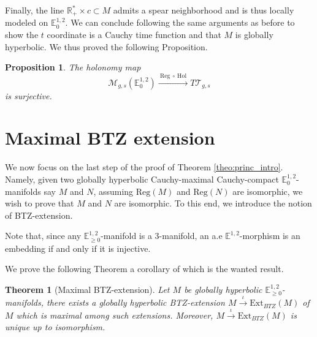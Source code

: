 \documentclass[a4paper,12pt]{article}
\def\M{\mathcal{M}}
\def\T{\mathcal{T}}
\def\RR{\mathbb{R}}
\newcommand{\mass}[1]{{\mathbb E}^{1,2}_{#1}}
\def\Hol{\mathrm{Hol}}
\def\Reg{\mathrm{Reg}}
\def\BTZext{\mathrm{Ext}_{BTZ}}
\def\reg{\Reg}
\newtheorem{theo}{Theorem}    %
\newtheorem{propou}[lemou]{Proposition}
\begin{document}
  Finally, the line $\RR_+^*\times c \subset M$ admits a spear neighborhood and is thus  locally modeled on $\mass{0}$. We can conclude following the same arguments as before to show the $t$ coordinate is a Cauchy time function and that $M$ is globally hyperbolic. We thus proved the following Proposition.



\begin{propou}\label{btzprop:surjective}\label{prop:surjective}
  The holonomy map $$ \M_{g,s}(\mass{0}) \xrightarrow{~\reg~\circ~\Hol~} T\T_{g,s}$$
  is surjective.
\end{propou}





  \section{Maximal BTZ extension} \label{sec:extension_BTZ_2}

  
      We now focus on the last step of the proof of Theorem \ref{theo:princ_intro}. Namely, given two globally hyperbolic Cauchy-maximal Cauchy-compact $\mass{0}$-manifolds say $M$ and $N$, assuming $\reg(M)$ and $\reg(N)$ are isomorphic, we wish to prove that $M$ and $N$  are isomorphic. To this end, we introduce the notion of BTZ-extension.
   
	Note that, since any $\mass{\geq 0}$-manifold is a 3-manifold,  an  a.e $\mass{}$-morphism is an embedding if and only if it is injective.
        
        We prove the following Theorem a corollary of which is the wanted result.
      \setcounter{theo}{1}

      \begin{theo}[Maximal BTZ-extension]\label{btzthm:maximal_btz_extension} Let $M$ be globally hyperbolic $\mass{\geq 0}$-manifolds, there exists a globally hyperbolic BTZ-extension $M \xrightarrow{\iota} \BTZext(M)$ of $M$ which is maximal among such extensions. Moreover, $M\xrightarrow{\iota}  \BTZext(M)$ is unique up to isomorphism.
  
      \end{theo}
       
\end{document}
